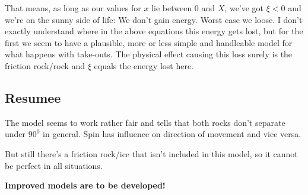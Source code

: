 That means, as long as our values for $x$ lie between 0 and $X$, we've got $\xi
< 0$ and we're on the sunny side of life: We don't gain energy. Worst case we
loose. I don't exactly understand where in the above equations this energy gets
lost, but for the first we seem to have a plausible, more or less simple and
handleable model for what happens with take-outs. The physical effect causing
this loss surely is the friction rock/rock and $ \xi $ equals the energy lost
here.


\subsection{Resumee}

The model seems to work rather fair and tells that both rocks don't separate
under $ 90^0 $ in general. Spin
has influence on direction of movement and vice versa.

But still there's a friction rock/ice that isn't included in this model, so 
it cannot be perfect in all situations.

\textbf{Improved models are to be developed!}


